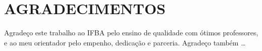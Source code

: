 \pagebreak\newpage\clearpage
\pagestyle{plain}

\chapter*{AGRADECIMENTOS}
    Agradeço este trabalho ao IFBA pelo ensino de qualidade com ótimos professores, e ao meu orientador pelo empenho, dedicação e parceria. Agradeço também \ldots
